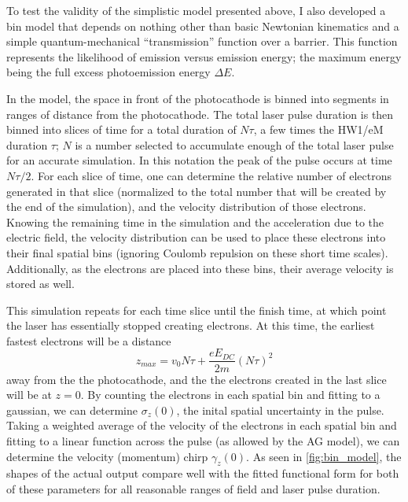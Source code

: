To test the validity of the simplistic model presented above, I also developed a bin model that depends on nothing other than basic Newtonian kinematics and a simple quantum-mechanical ``transmission'' function over a barrier.
This function represents the likelihood of emission versus emission energy; the maximum energy being the full excess photoemission energy $\Delta E$.

In the model, the space in front of the photocathode is binned into segments in ranges of distance from the photocathode.
The total laser pulse duration is then binned into slices of time for a total duration of $N \tau$, a few times the HW1/eM duration $\tau$; $N$ is a number selected to accumulate enough of the total laser pulse for an accurate simulation.
In this notation the peak of the pulse occurs at time $N \tau / 2$.
For each slice of time, one can determine the relative number of electrons generated in that slice (normalized to the total number that will be created by the end of the simulation), and the velocity distribution of those electrons.
Knowing the remaining time in the simulation and the acceleration due to the electric field, the velocity distribution can be used to place these electrons into their final spatial bins (ignoring Coulomb repulsion on these short time scales).
Additionally, as the electrons are placed into these bins, their average velocity is stored as well.

This simulation repeats for each time slice until the finish time, at which point the laser has essentially stopped creating electrons.
At this time, the earliest fastest electrons will be a distance 
\begin{equation}
  z_{max} = v_0 N \tau + \frac{e E_{ DC }}{2 m} (N \tau)^2 
\end{equation}
away from the the photocathode, and the the electrons created in the last slice will be at $z=0$.
By counting the electrons in each spatial bin and fitting to a gaussian, we can determine $\sigma_z(0)$, the inital spatial uncertainty in the pulse.
Taking a weighted average of the velocity of the electrons in each spatial bin and fitting to a linear function across the pulse (as allowed by the AG model), we can determine the velocity (momentum) chirp $\gamma_z(0)$.
As seen in \ref{fig:bin_model}, the shapes of the actual output compare well with the fitted functional form for both of these parameters for all reasonable ranges of field and laser pulse duration.


